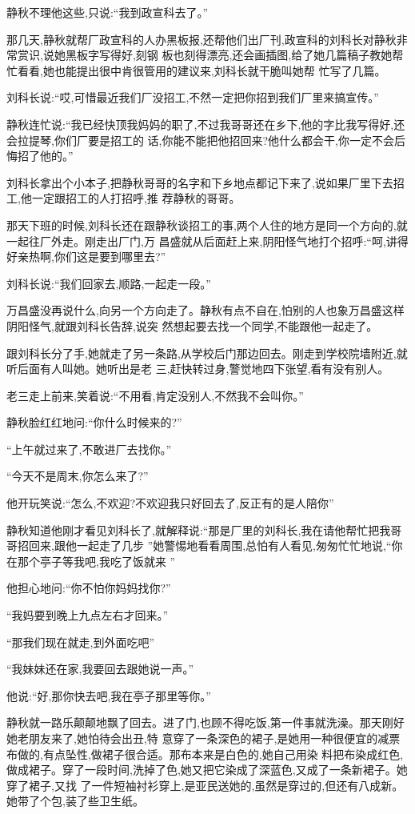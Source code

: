 ﻿\documentclass[12pt]{article}
\begin{document}
静秋不理他这些,只说:``我到政宣科去了。''

那几天,静秋就帮厂政宣科的人办黑板报,还帮他们出厂刊,政宣科的刘科长对静秋非常赏识,说她黑板字写得好,刻钢
板也刻得漂亮,还会画插图,给了她几篇稿子教她帮忙看看,她也能提出很中肯很管用的建议来,刘科长就干脆叫她帮
忙写了几篇。

刘科长说:``哎,可惜最近我们厂没招工,不然一定把你招到我们厂里来搞宣传。''

静秋连忙说:``我已经快顶我妈妈的职了,不过我哥哥还在乡下,他的字比我写得好,还会拉提琴,你们厂要是招工的
话,你能不能把他招回来?他什么都会干,你一定不会后悔招了他的。''

刘科长拿出个小本子,把静秋哥哥的名字和下乡地点都记下来了,说如果厂里下去招工,他一定跟招工的人打招呼,推
荐静秋的哥哥。

那天下班的时候,刘科长还在跟静秋谈招工的事,两个人住的地方是同一个方向的,就一起往厂外走。刚走出厂门,万
昌盛就从后面赶上来,阴阳怪气地打个招呼:``呵,讲得好亲热啊,你们这是要到哪里去?''

刘科长说:``我们回家去,顺路,一起走一段。''

万昌盛没再说什么,向另一个方向走了。静秋有点不自在,怕别的人也象万昌盛这样阴阳怪气,就跟刘科长告辞,说突
然想起要去找一个同学,不能跟他一起走了。

跟刘科长分了手,她就走了另一条路,从学校后门那边回去。刚走到学校院墙附近,就听后面有人叫她。她听出是老
三,赶快转过身,警觉地四下张望,看有没有别人。

老三走上前来,笑着说:``不用看,肯定没别人,不然我不会叫你。''

静秋脸红红地问:``你\myrule 什么时候来的?''

``上午就过来了,不敢进厂去找你。''

``今天不是周末,你怎么来了?''

他开玩笑说:``怎么,不欢迎?不欢迎我只好回去了\myrule ,反正有的是人陪你\myrule ''

静秋知道他刚才看见刘科长了,就解释说:``那是厂里的刘科长,我在请他帮忙把我哥哥招回来,跟他一起走了几步
\myrule ''她警惕地看看周围,总怕有人看见,匆匆忙忙地说,``你\myrule 在那个亭子等我吧,我吃了饭就来
\myrule ''

他担心地问:``你不怕你妈妈\myrule 找你?''

``我妈要到晚上九点左右才回来。''

``那\myrule 我们现在就走,到外面吃吧\myrule ''

``我妹妹还在家,我要回去跟她\myrule 说一声。''

他说:``好,那你快去吧,我在亭子那里等你。''

静秋就一路乐颠颠地飘了回去。进了门,也顾不得吃饭,第一件事就洗澡。那天刚好她老朋友来了,她怕待会出丑,特
意穿了一条深色的裙子,是她用一种很便宜的减票布做的,有点坠性,做裙子很合适。那布本来是白色的,她自己用染
料把布染成红色,做成裙子。穿了一段时间,洗掉了色,她又把它染成了深蓝色,又成了一条新裙子。她穿了裙子,又找
了一件短袖衬衫穿上,是亚民送她的,虽然是穿过的,但还有八成新。她带了个包,装了些卫生纸。
\end{document}
